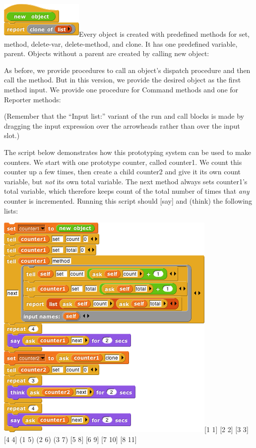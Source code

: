\includegraphics[width=1.57292in,height=0.6875in]{media/image865.png}Every
object is created with predefined methods for set, method, delete-var,
delete-method, and clone. It has one predefined variable, parent.
Objects without a parent are created by calling new object:

As before, we provide procedures to call an object's dispatch procedure
and then call the method. But in this version, we provide the desired
object as the ﬁrst method input. We provide one procedure for Command
methods and one for Reporter methods:

(Remember that the ``Input list:'' variant of the run and call blocks is
made by dragging the input expression over the arrowheads rather than
over the input slot.)

The script below demonstrates how this prototyping system can be used to
make counters. We start with one prototype counter, called counter1. We
count this counter up a few times, then create a child counter2 and give
it its own count variable, but \emph{not} its own total variable. The
next method always sets counter1's total variable, which therefore keeps
count of the total number of times that \emph{any} counter is
incremented. Running this script should {[}say{]} and (think) the
following lists:

\includegraphics[width=4.20833in,height=4.39583in]{media/image870.png}{[}1
1{]} {[}2 2{]} {[}3 3{]} {[}4 4{]} (1 5) (2 6) (3 7) {[}5 8{]} {[}6 9{]}
{[}7 10{]} {[}8 11{]}

